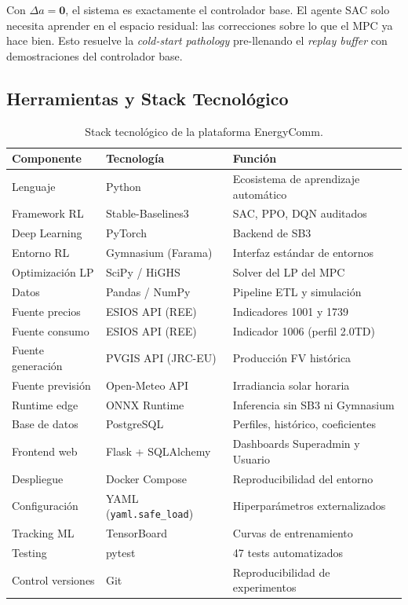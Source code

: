 \documentclass[12pt, a4paper, twoside]{report}
\begin{document}
Con $\Delta a = \mathbf{0}$, el sistema es exactamente el controlador base.
El agente SAC solo necesita aprender en el espacio residual: las correcciones
sobre lo que el MPC ya hace bien. Esto resuelve la \textit{cold-start pathology}
pre-llenando el \textit{replay buffer} con demostraciones del controlador base.

\subsection{Herramientas y Stack Tecnológico}
\label{sub:herramientas}

\begin{table}[H]
\centering
\caption{Stack tecnológico de la plataforma EnergyComm.}
\label{tab:stack}
\begin{tabularx}{\textwidth}{llX}
\toprule
\textbf{Componente} & \textbf{Tecnología} & \textbf{Función} \\
\midrule
Lenguaje & Python & Ecosistema de aprendizaje automático \\
Framework RL & Stable-Baselines3 & SAC, PPO, DQN auditados \\
Deep Learning & PyTorch & Backend de SB3 \\
Entorno RL & Gymnasium (Farama) & Interfaz estándar de entornos \\
Optimización LP & SciPy / HiGHS & Solver del LP del MPC \\
Datos & Pandas / NumPy & Pipeline ETL y simulación \\
Fuente precios & ESIOS API (REE) & Indicadores 1001 y 1739 \\
Fuente consumo & ESIOS API (REE) & Indicador 1006 (perfil 2.0TD) \\
Fuente generación & PVGIS API (JRC-EU) & Producción FV histórica \\
Fuente previsión & Open-Meteo API & Irradiancia solar horaria \\
Runtime edge & ONNX Runtime & Inferencia sin SB3 ni Gymnasium \\
Base de datos & PostgreSQL & Perfiles, histórico, coeficientes \\
Frontend web & Flask + SQLAlchemy & Dashboards Superadmin y Usuario \\
Despliegue & Docker Compose & Reproducibilidad del entorno \\
Configuración & YAML (\texttt{yaml.safe\_load}) & Hiperparámetros externalizados \\
Tracking ML & TensorBoard & Curvas de entrenamiento \\
Testing & pytest & 47 tests automatizados \\
Control versiones & Git & Reproducibilidad de experimentos \\
\bottomrule
\end{tabularx}
\end{table}
\end{document}
